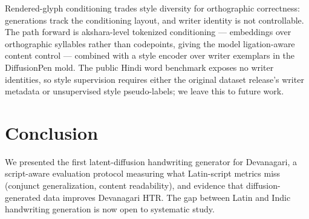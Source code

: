\documentclass{llncs}
\begin{document}
Rendered-glyph conditioning trades style diversity for orthographic
correctness: generations track the conditioning layout, and writer identity
is not controllable. The path forward is akshara-level tokenized
conditioning — embeddings over orthographic syllables rather than
codepoints, giving the model ligation-aware content control — combined with
a style encoder over writer exemplars in the DiffusionPen mold. The public
Hindi word benchmark exposes no writer identities, so style supervision
requires either the original dataset release's writer metadata or
unsupervised style pseudo-labels; we leave this to future work.

\section{Conclusion}

We presented the first latent-diffusion handwriting generator for
Devanagari, a script-aware evaluation protocol measuring what Latin-script
metrics miss (conjunct generalization, content readability), and evidence
that diffusion-generated data improves Devanagari HTR. The gap between
Latin and Indic handwriting generation is now open to systematic study.



\end{document}
